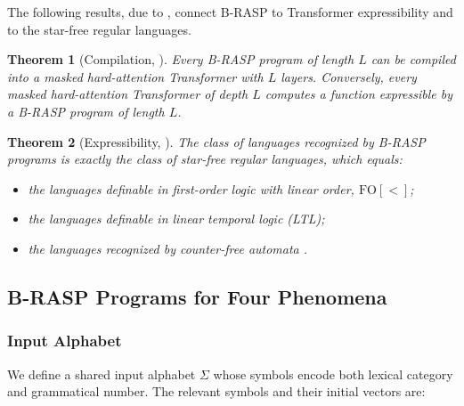 \documentclass[11pt]{article}
\newtheorem{theorem}{Theorem}
\begin{document}
The following results, due to \citet{DBLP:conf/nips/Yang0A24}, connect B-RASP to Transformer expressibility and to the star-free regular languages.

\begin{theorem}[Compilation, {\citealp{DBLP:conf/nips/Yang0A24}}]
\label{thm:compile}
Every B-RASP program of length $L$ can be compiled into a masked hard-attention Transformer with $L$ layers.
Conversely, every masked hard-attention Transformer of depth $L$ computes a function expressible by a B-RASP program of length $L$.
\end{theorem}

\begin{theorem}[Expressibility, {\citealp{DBLP:conf/nips/Yang0A24}}]
\label{thm:expressibility}
The class of languages recognized by B-RASP programs is exactly the class of star-free regular languages, which equals:
\begin{itemize}[itemsep=1pt,leftmargin=*]
    \item the languages definable in first-order logic with linear order, $\mathrm{FO}[<]$;
    \item the languages definable in linear temporal logic (LTL);
    \item the languages recognized by counter-free automata \citep{mcnaughton1971counter}.
\end{itemize}
\end{theorem}

\subsection{B-RASP Programs for Four Phenomena}
\label{app:programs}

\subsubsection{Input Alphabet}
\label{app:alphabet}

We define a shared input alphabet $\Sigma$ whose symbols encode both lexical category and grammatical number.
The relevant symbols and their initial vectors are:
\end{document}
